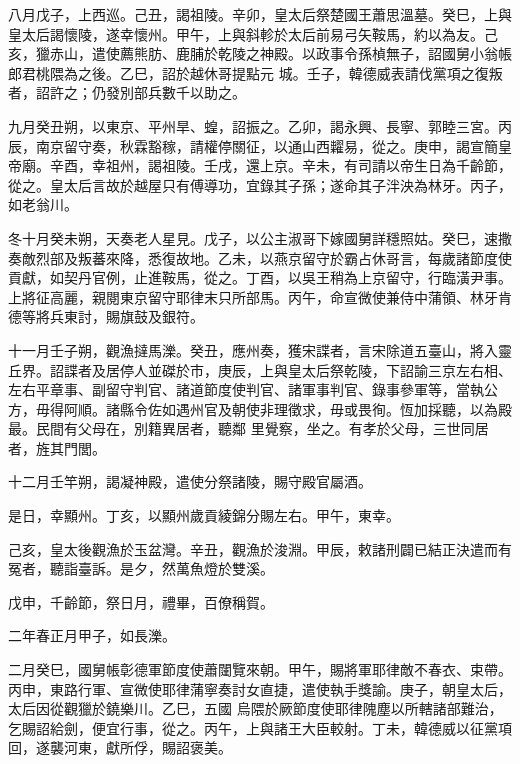 \begin{pinyinscope}
 八月戊子，上西巡。己丑，謁祖陵。辛卯，皇太后祭楚國王蕭思溫墓。癸巳，上與皇太后謁懷陵，遂幸懷州。甲午，上與斜軫於太后前易弓矢鞍馬，約以為友。己亥，獵赤山，遣使薦熊肪、鹿脯於乾陵之神殿。以政事令孫楨無子，詔國舅小翁帳郎君桃隈為之後。乙巳，詔於越休哥提點元
 城。壬子，韓德威表請伐黨項之復叛者，詔許之；仍發別部兵數千以助之。



 九月癸丑朔，以東京、平州旱、蝗，詔振之。乙卯，謁永興、長寧、郭睦三宮。丙辰，南京留守奏，秋霖豁稼，請權停關征，以通山西糶易，從之。庚申，謁宣簡皇帝廟。辛酉，幸祖州，謁祖陵。壬戌，還上京。辛未，有司請以帝生日為千齡節，從之。皇太后言故於越屋只有傅導功，宜錄其子孫；遂命其子泮泱為林牙。丙子，如老翁川。



 冬十月癸未朔，天奏老人星見。戊子，以公主淑哥下嫁國舅詳穩照姑。癸巳，速撒奏敵烈部及叛蕃來降，悉復故地。乙未，以燕京留守於霸占休哥言，每歲諸節度使
 貢獻，如契丹官例，止進鞍馬，從之。丁酉，以吳王稍為上京留守，行臨潢尹事。上將征高麗，親閱東京留守耶律末只所部馬。丙午，命宣微使兼侍中蒲領、林牙肯德等將兵東討，賜旗鼓及銀符。



 十一月壬子朔，觀漁撻馬濼。癸丑，應州奏，獲宋諜者，言宋除道五臺山，將入靈丘界。詔諜者及居停人並磔於市，庚辰，上與皇太后祭乾陵，下詔諭三京左右相、左右平章事、副留守判官、諸道節度使判官、諸軍事判官、錄事參軍等，當執公方，毋得阿順。諸縣令佐如遇州官及朝使非理徵求，毋或畏徇。恆加採聽，以為殿最。民間有父母在，別籍異居者，聽鄰
 里覺察，坐之。有孝於父母，三世同居者，旌其門閭。



 十二月壬竿朔，謁凝神殿，遣使分祭諸陵，賜守殿官屬酒。



 是日，幸顯州。丁亥，以顯州歲貢綾錦分賜左右。甲午，東幸。



 己亥，皇太後觀漁於玉盆灣。辛丑，觀漁於浚淵。甲辰，敕諸刑闢已結正決遣而有冤者，聽詣臺訴。是夕，然萬魚燈於雙溪。



 戊申，千齡節，祭日月，禮畢，百僚稱賀。



 二年春正月甲子，如長濼。



 二月癸巳，國舅帳彰德軍節度使蕭闥覽來朝。甲午，賜將軍耶律敵不春衣、束帶。丙申，東路行軍、宣微使耶律蒲寧奏討女直捷，遣使執手獎諭。庚子，朝皇太后，太后因從觀獵於鐃樂川。乙巳，五國
 烏隈於厥節度使耶律隗塵以所轄諸部難治，乞賜詔給劍，便宜行事，從之。丙午，上與諸王大臣較射。丁未，韓德威以征黨項回，遂襲河東，獻所俘，賜詔褒美。




\end{pinyinscope}
